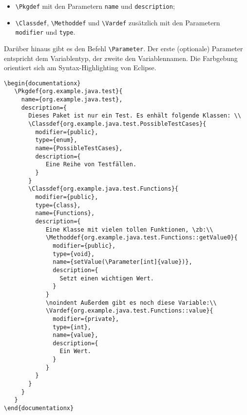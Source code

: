 			\begin{itemize}
				\item \verb|\Pkgdef| mit den Parametern \texttt{name} und \texttt{description};
				\item \verb|\Classdef|, \verb|\Methoddef| und \verb|\Vardef| zusätzlich mit den Parametern \texttt{modifier} und \texttt{type}.
			\end{itemize}
			Darüber hinaus gibt es den Befehl \verb|\Parameter|. Der erste (optionale) Parameter entspricht dem Variablentyp, der zweite den Variablennamen.
			Die Farbgebung orientiert sich am Syntax-Highlighting von Eclipse.

			\newpage
			\enlargethispage*{1em}
			\begin{verbatim}
\begin{documentationx}
   \Pkgdef{org.example.java.test}{
     name={org.example.java.test},
     description={
       Dieses Paket ist nur ein Test. Es enhält folgende Klassen: \\
       \Classdef{org.example.java.test.PossibleTestCases}{
         modifier={public},
         type={enum},
         name={PossibleTestCases},
         description={
            Eine Reihe von Testfällen.
         }
       }
       \Classdef{org.example.java.test.Functions}{
         modifier={public},
         type={class},
         name={Functions},
         description={
            Eine Klasse mit vielen tollen Funktionen, \zb:\\
            \Methoddef{org.example.java.test.Functions::getValue0}{
              modifier={public},
              type={void},
              name={setValue(\Parameter[int]{value})},
              description={
                Setzt einen wichtigen Wert.
              }
            }
            \noindent Außerdem gibt es noch diese Variable:\\
            \Vardef{org.example.java.test.Functions::value}{
              modifier={private},
              type={int},
              name={value},
              description={
                Ein Wert.
              }
            }
         }
       }
     }
   }
\end{documentationx}
			\end{verbatim}

